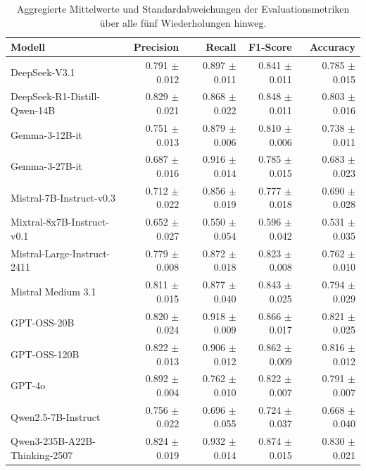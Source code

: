 \begin{table}[htbp]
    \centering
    \caption{Aggregierte Mittelwerte und Standardabweichungen der Evaluationsmetriken über alle fünf Wiederholungen hinweg.}
    \label{tab:metrics-overview}
    \begin{adjustbox}{width=\textwidth}
        \begin{tabular}{l r r r r}
            \toprule
            Modell                          & Precision         & Recall            & F1-Score          & Accuracy \\
            \midrule
            DeepSeek-V3.1                   & 0.791 $\pm$ 0.012 & 0.897 $\pm$ 0.011 & 0.841 $\pm$ 0.011 & 0.785 $\pm$ 0.015 \\
            DeepSeek-R1-Distill-Qwen-14B    & 0.829 $\pm$ 0.021 & 0.868 $\pm$ 0.022 & 0.848 $\pm$ 0.011 & 0.803 $\pm$ 0.016 \\
            Gemma-3-12B-it                  & 0.751 $\pm$ 0.013 & 0.879 $\pm$ 0.006 & 0.810 $\pm$ 0.006 & 0.738 $\pm$ 0.011 \\
            Gemma-3-27B-it                  & 0.687 $\pm$ 0.016 & 0.916 $\pm$ 0.014 & 0.785 $\pm$ 0.015 & 0.683 $\pm$ 0.023 \\
            Mistral-7B-Instruct-v0.3        & 0.712 $\pm$ 0.022 & 0.856 $\pm$ 0.019 & 0.777 $\pm$ 0.018 & 0.690 $\pm$ 0.028 \\
            Mixtral-8x7B-Instruct-v0.1      & 0.652 $\pm$ 0.027 & 0.550 $\pm$ 0.054 & 0.596 $\pm$ 0.042 & 0.531 $\pm$ 0.035 \\
            Mistral-Large-Instruct-2411     & 0.779 $\pm$ 0.008 & 0.872 $\pm$ 0.018 & 0.823 $\pm$ 0.008 & 0.762 $\pm$ 0.010 \\
            Mistral Medium 3.1              & 0.811 $\pm$ 0.015 & 0.877 $\pm$ 0.040 & 0.843 $\pm$ 0.025 & 0.794 $\pm$ 0.029 \\
            GPT-OSS-20B                     & 0.820 $\pm$ 0.024 & 0.918 $\pm$ 0.009 & 0.866 $\pm$ 0.017 & 0.821 $\pm$ 0.025 \\
            GPT-OSS-120B                    & 0.822 $\pm$ 0.013 & 0.906 $\pm$ 0.012 & 0.862 $\pm$ 0.009 & 0.816 $\pm$ 0.012 \\
            GPT-4o                          & 0.892 $\pm$ 0.004 & 0.762 $\pm$ 0.010 & 0.822 $\pm$ 0.007 & 0.791 $\pm$ 0.007 \\
            Qwen2.5-7B-Instruct             & 0.756 $\pm$ 0.022 & 0.696 $\pm$ 0.055 & 0.724 $\pm$ 0.037 & 0.668 $\pm$ 0.040 \\
            Qwen3-235B-A22B-Thinking-2507   & 0.824 $\pm$ 0.019 & 0.932 $\pm$ 0.014 & 0.874 $\pm$ 0.015 & 0.830 $\pm$ 0.021 \\
            \bottomrule
        \end{tabular}
    \end{adjustbox}
\end{table}

